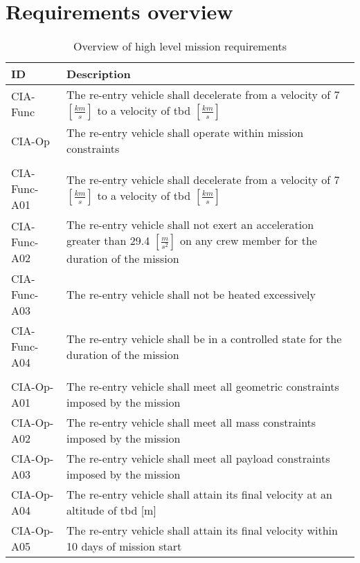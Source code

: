 \section{Requirements overview} \label{app:req}

\begin{table}[H]
	\caption*{Overview of high level mission requirements} \label{tab:toplevelreq}
	\begin{tabular}{|p{}|p{}|}
    \hline
    ID          & Description                                                                                                      \\ \hline \hline
    CIA-Func & The re-entry vehicle shall decelerate from a velocity of 7 $[\frac{km}{s}]$ to a velocity of \gls{tbd} $[\frac{km}{s}]$  \\ \hline
    CIA-Op & The re-entry vehicle shall operate within mission constraints                                               \\ \hline
& \\ \hline
    CIA-Func-A01 & The re-entry vehicle shall decelerate from a velocity of 7 $[\frac{km}{s}]$ to a velocity of \gls{tbd} $[\frac{km}{s}]$     \\ \hline
    CIA-Func-A02 & The re-entry vehicle shall not exert an acceleration greater than 29.4 $[\frac{m}{s^2}]$ on any crew member for the duration of the mission			\\ \hline
    CIA-Func-A03 & The re-entry vehicle shall not be heated excessively  \\ \hline
    CIA-Func-A04 & The re-entry vehicle shall be in a controlled state for the duration of the mission                            \\ \hline
& \\ \hline
    CIA-Op-A01 & The re-entry vehicle shall meet all geometric constraints imposed by the mission                           \\ \hline
    CIA-Op-A02 & The re-entry vehicle shall meet all mass constraints imposed by the mission                                      \\ \hline
	CIA-Op-A03 & The re-entry vehicle shall meet all payload constraints imposed by the mission \\ \hline
	CIA-Op-A04 & The re-entry vehicle shall attain its final velocity at an altitude of \gls{tbd} [m] \\ \hline
	CIA-Op-A05 & The re-entry vehicle shall attain its final velocity within 10 days of mission start \\ \hline

\end{tabular}
\end{table}
